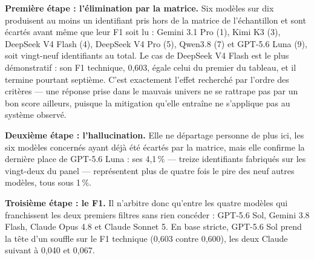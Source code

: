 \textbf{Première étape : l'élimination par la matrice.} Six modèles sur dix produisent au moins un identifiant pris hors de la matrice de l'échantillon et sont écartés avant même que leur F1 soit lu : Gemini 3.1 Pro (1), Kimi K3 (3), DeepSeek V4 Flash (4), DeepSeek V4 Pro (5), Qwen3.8 (7) et GPT-5.6 Luna (9), soit vingt-neuf identifiants au total. Le cas de DeepSeek V4 Flash est le plus démonstratif : son F1 technique, 0,603, égale celui du premier du tableau, et il termine pourtant septième. C'est exactement l'effet recherché par l'ordre des critères --- une réponse prise dans le mauvais univers ne se rattrape pas par un bon score ailleurs, puisque la mitigation qu'elle entraîne ne s'applique pas au système observé.

\textbf{Deuxième étape : l'hallucination.} Elle ne départage personne de plus ici, les six modèles concernés ayant déjà été écartés par la matrice, mais elle confirme la dernière place de GPT-5.6 Luna : ses 4,1\,\% --- treize identifiants fabriqués sur les vingt-deux du panel --- représentent plus de quatre fois le pire des neuf autres modèles, tous sous 1\,\%.

\textbf{Troisième étape : le F1.} Il n'arbitre donc qu'entre les quatre modèles qui franchissent les deux premiers filtres sans rien concéder : GPT-5.6 Sol, Gemini 3.8 Flash, Claude Opus 4.8 et Claude Sonnet 5. En base stricte, GPT-5.6 Sol prend la tête d'un souffle sur le F1 technique (0,603 contre 0,600), les deux Claude suivant à 0,040 et 0,067.

